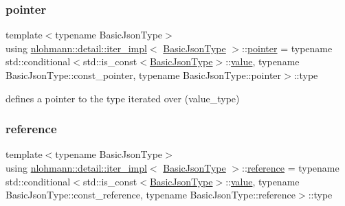 \mbox{\label{classnlohmann_1_1detail_1_1iter__impl_a69e52f890ce8c556fd68ce109e24b360}} 
\subsubsection{\texorpdfstring{pointer}{pointer}}
{\footnotesize\ttfamily template$<$typename Basic\+Json\+Type$>$ \\
using \hyperlink{classnlohmann_1_1detail_1_1iter__impl}{nlohmann\+::detail\+::iter\+\_\+impl}$<$ \hyperlink{classnlohmann_1_1detail_1_1iter__impl_abf18f18793f84b0222aebb5a2a87da7a}{Basic\+Json\+Type} $>$\+::\hyperlink{classnlohmann_1_1detail_1_1iter__impl_a69e52f890ce8c556fd68ce109e24b360}{pointer} =  typename std\+::conditional$<$std\+::is\+\_\+const$<$\hyperlink{classnlohmann_1_1detail_1_1iter__impl_abf18f18793f84b0222aebb5a2a87da7a}{Basic\+Json\+Type}$>$\+::\hyperlink{classnlohmann_1_1detail_1_1iter__impl_ab447c50354c6611fa2ae0100ac17845c}{value}, typename Basic\+Json\+Type\+::const\+\_\+pointer, typename Basic\+Json\+Type\+::pointer$>$\+::type}



defines a pointer to the type iterated over (value\+\_\+type) 

\mbox{\label{classnlohmann_1_1detail_1_1iter__impl_a5be8001be099c6b82310f4d387b953ce}} 
\subsubsection{\texorpdfstring{reference}{reference}}
{\footnotesize\ttfamily template$<$typename Basic\+Json\+Type$>$ \\
using \hyperlink{classnlohmann_1_1detail_1_1iter__impl}{nlohmann\+::detail\+::iter\+\_\+impl}$<$ \hyperlink{classnlohmann_1_1detail_1_1iter__impl_abf18f18793f84b0222aebb5a2a87da7a}{Basic\+Json\+Type} $>$\+::\hyperlink{classnlohmann_1_1detail_1_1iter__impl_a5be8001be099c6b82310f4d387b953ce}{reference} =  typename std\+::conditional$<$std\+::is\+\_\+const$<$\hyperlink{classnlohmann_1_1detail_1_1iter__impl_abf18f18793f84b0222aebb5a2a87da7a}{Basic\+Json\+Type}$>$\+::\hyperlink{classnlohmann_1_1detail_1_1iter__impl_ab447c50354c6611fa2ae0100ac17845c}{value}, typename Basic\+Json\+Type\+::const\+\_\+reference, typename Basic\+Json\+Type\+::reference$>$\+::type}



